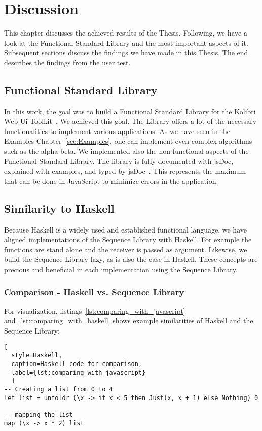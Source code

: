 \section{Discussion}
\label{sec:Discussion}
This chapter discusses the achieved results of the Thesis. Following, we have a look at the
Functional Standard Library and the most important aspects of it. Subsequent sections
discuss the findings we have made in this Thesis. The end describes the
findings from the user test. 

\subsection{Functional Standard Library}
\label{sub:Functional Standard Library}
In this work, the goal was to build a Functional Standard Library for the
Kolibri Web Ui Toolkit~\cite{kolibri}. We achieved
this goal. The Library offers a lot of the necessary functionalities to implement
various applications. As we have seen in the Examples Chapter~\ref{sec:Examples}, one can implement
even complex algorithms such as the alpha-beta. We implemented also the
non-functional aspects of the Functional Standard Library. The library is fully
documented with jsDoc, explained with examples, and typed by jsDoc~\cite{jsdoc_use_2023}. 
This represents the maximum that can
be done in JavaScript to minimize errors in the application.

\subsection{Similarity to Haskell}
\label{sub:Similarity to Haskell}
Because Haskell is a widely used and established functional language, we have
aligned implementations of the Sequence Library with Haskell. For
example the functions are stand alone and the receiver is passed as argument. 
Likewise, we build the Sequence Library lazy, as is also the case in Haskell. 
These concepts are precious and beneficial in each implementation using the Sequence Library.

\subsubsection{Comparison - Haskell vs. Sequence Library}
\label{Comparion - Haskell vs. Sequence Library}
For visualization, listings~\ref{lst:comparing_with_javascript} and~\ref{lst:comparing_with_haskell} 
shows example similarities of Haskell and the Sequence Library:

\begin{lstlisting}[
  style=Haskell, 
  caption=Haskell code for comparison, 
  label={lst:comparing_with_javascript}
  ]
-- Creating a list from 0 to 4
let list = unfoldr (\x -> if x < 5 then Just(x, x + 1) else Nothing) 0

-- mapping the list
map (\x -> x * 2) list 
\end{lstlisting}

